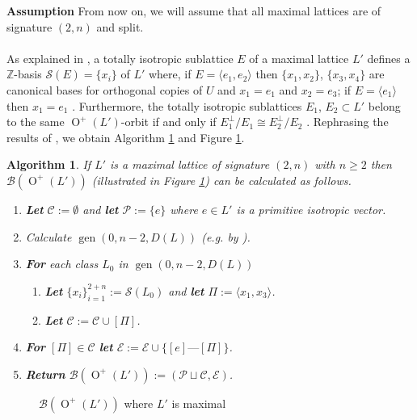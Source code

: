 \documentclass[12pt, a4paper]{article}
\newtheorem{algo}{Algorithm}[section]
\newcommand{\ZZ}{\mathbb{Z}}
\newcommand{\la}{\langle}
\newcommand{\ra}{\rangle}
\newcommand{\bc}{\mathcal{B}}
\newcommand{\cc}{\mathcal{C}}
\newcommand{\ec}{\mathcal{E}}
\newcommand{\pc}{\mathcal{P}}
\newcommand{\Sc}{\mathcal{S}}
\newcommand{\opn}{\operatorname}
\newcommand{\old}{\opn{O}^+(L')}
\begin{document}
\noindent \textbf{Assumption}  
From now on, we will assume that all maximal lattices are of signature $(2,n)$ and split.
\\
\\
As explained in \cite[\S5]{Attwell-Duval}, a totally isotropic sublattice $E$ of a maximal lattice $L'$ defines a $\ZZ$-basis $\Sc(E)  = \{x_i  \}$ of $L'$ where, if  
$E = \la e_1, e_2 \ra$ then
$\{x_1, x_2 \}$,
$\{x_3, x_4 \}$
are canonical bases for orthogonal copies of $U$ and $x_1 = e_1$ and $x_2=e_3$;
if $E = \la e_1 \ra$ then $x_1=e_1$ \cite{Attwell-Duval}.
Furthermore, the totally isotropic sublattices $E_1$, $E_2 \subset L'$ belong to the same $\opn{O}^+(L')$-orbit if and only if $E_1^{\perp}/E_1 \cong E_2^{\perp}/E_2$ \cite{Attwell-Duval}.
Rephrasing the results of \cite{Attwell-Duval}, we obtain Algorithm \ref{MaximalAlgo} and Figure \ref{MaximalBuilding}.
\begin{algo}\label{MaximalAlgo}
  If $L'$ is a maximal lattice of signature $(2, n)$ with $n \geq 2$ then $\bc(\old)$ (illustrated in Figure \ref{MaximalBuilding}) can be calculated as follows.
  \begin{enumerate}
  \item \textbf{Let} $\cc:=\emptyset$ and \textbf{let} $\pc:=\{e\}$ where $e \in L'$ is a primitive isotropic vector.
  \item Calculate $\opn{gen}(0, n-2, D(L))$ (e.g. by \cite{largeclass}).
  \item \textbf{For} each class $L_0$ in $\opn{gen}(0, n-2, D(L))$
    \begin{enumerate}
    \item \textbf{Let} $\{x_i\}_{i=1}^{2+n}:=\Sc(L_0)$ and \textbf{let} $\Pi := \la x_1, x_3 \ra$.
    \item \textbf{Let} $\cc:=\cc \cup [\Pi]$.
    \end{enumerate}
  \item \textbf{For} $[\Pi] \in \cc$
    \textbf{let} $\ec:=\ec \cup \{ [e] \text{---}[\Pi]\}$.
\item \textbf{Return} $\bc(\opn{O}^+(L')) := (\pc \sqcup \cc, \ec)$.
  \end{enumerate}
\end{algo}
\begin{figure}
  \centering
  \caption{$\bc(\old)$ where $L'$ is maximal}\label{MaximalBuilding}
\end{figure}
\end{document}
